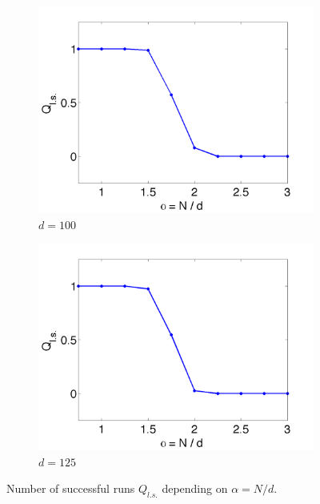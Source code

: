 \begin{figure}
	\begin{subfigure}{0.48\textwidth}
		\centering
		\includegraphics[width=\textwidth]{./img/Ab_N100_nd75_nmax250}
		\caption{$d=100$}
		\label{fig:2:experiment:N100}
	\end{subfigure}	
	\begin{subfigure}{0.48\textwidth}
		\centering
		\includegraphics[width=\textwidth]{./img/Ab_N125_nd75_nmax250}
		\caption{$d=125$}
		\label{fig:2:experiment:N125}
	\end{subfigure}

	\caption{Number of successful runs $Q_{l.s.}$ depending on $\alpha = N / d$.}
	\label{fig:2:experiment}
\end{figure}



